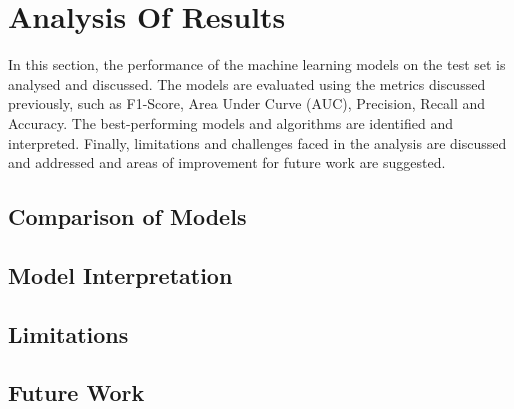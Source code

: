 
\section{Analysis Of Results}
 \label{sec: Analysis Of Results}


In this section, the performance of the machine learning models on the test set is analysed and discussed. The models are evaluated using the metrics discussed previously, such as F1-Score, Area Under Curve (AUC), Precision, Recall and Accuracy. The best-performing models and algorithms are identified and interpreted. Finally, limitations and challenges faced in the analysis are discussed and addressed and areas of improvement for future work are suggested.



\subsection{Comparison of Models}


\subsection{Model Interpretation}


\subsection{Limitations}


\subsection{Future Work}

